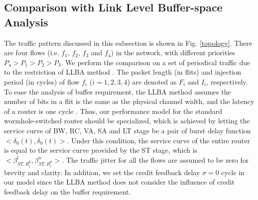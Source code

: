 \documentclass[preprint]{elsarticle}
\begin{document}
\subsection{Comparison with Link Level Buffer-space Analysis}\label{llacmp}
The traffic pattern discussed in this subsection is shown in Fig. \ref{topology}. There are four flows (i.e. $f_1$, $f_2$, $f_3$ and $f_4$) in the network, with different priorities $P_4>P_1>P_2>P_3$. We perform the comparison on a set of periodical traffic due to the restriction of LLBA method \cite{189}. The packet length (in flits) and injection period (in cycles) of flow $f_i$ ($i=1,2,3,4$) are denoted as $F_i$ and $I_i$, respectively. To ease the analysis of buffer requirement, the LLBA method assumes the number of bits in a flit is the same as the physical channel width, and the latency of a router is one cycle \cite{189}. Thus, our performance model for the standard wormhole-switched router should be specialized, which is achieved by letting the service curve of BW, RC, VA, SA and LT stage be a pair of burst delay function $<\delta_0(t),\delta_0(t)>$. Under this condition, the service curve of the entire router is equal to the service curve provided by the ST stage, which is $<\beta_{ST,R_i^p}^l,\beta_{ST,R_i^p}^u>$. The traffic jitter for all the flows are assumed to be zero for brevity and clarity. In addition, we set the credit feedback delay $\sigma=0$ cycle in our model since the LLBA method does not consider the influence of credit feedback delay on the buffer requirement.
\end{document}
